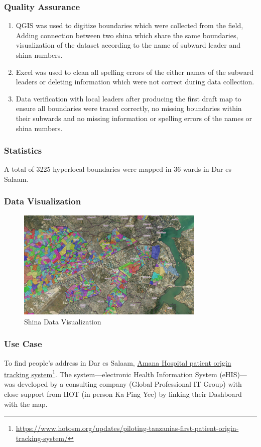 \documentclass[a4paper,12pt,twoside]{article}
\begin{document}
\subsubsection{Quality Assurance}
\begin{enumerate}
    \item QGIS was used to digitize boundaries which were collected from the field, Adding connection between two shina which share the same boundaries, visualization of the dataset according to the name of subward leader and shina numbers. 
    \item Excel was used to clean all spelling errors of the either names of the subward leaders or deleting information which were not correct during data collection. 
    \item Data verification with local leaders after producing the first draft map to ensure all boundaries were traced correctly, no missing boundaries within their subwards and no missing information or spelling errors of the names or shina numbers.

\end{enumerate}

\subsubsection{Statistics}
A total of 3225 hyperlocal boundaries were mapped in 36 wards in Dar es Salaam.

\subsubsection{Data Visualization}
\begin{figure}[h]
  \color{RHgreen}\caption{Shina Data Visualization}
  \centering
 \includegraphics[width=0.8\textwidth]{images/Shinas_Data_Viz.png}
\end{figure}

\subsubsection{Use Case}
To find people’s address in Dar es Salaam, \href{https://www.hotosm.org/updates/piloting-tanzanias-first-patient-origin-tracking-system/}{Amana Hospital patient origin tracking system}\footnote{\url{https://www.hotosm.org/updates/piloting-tanzanias-first-patient-origin-tracking-system/}}. The system---electronic Health Information System (eHIS)---was developed by a consulting company (Global Professional IT Group) with close support from HOT (in person Ka Ping Yee) by linking their Dashboard with the map.
\end{document}
